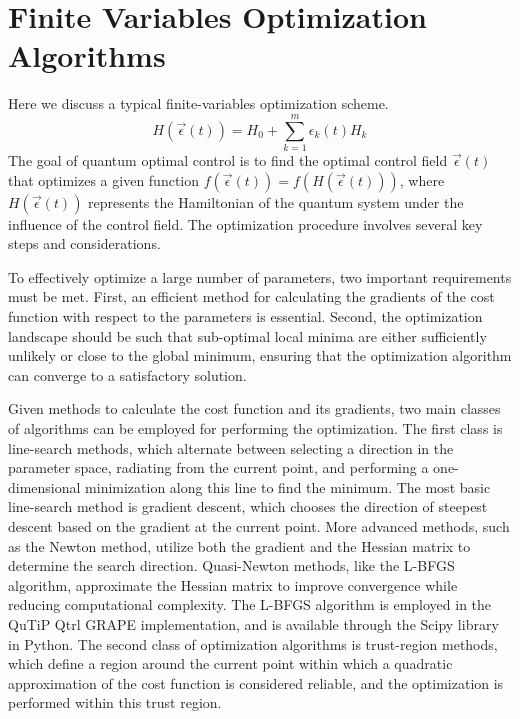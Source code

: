 \documentclass[12pt]{report}
\begin{document}
\section{Finite Variables Optimization Algorithms}\label{sec:finite_variables_optimization}
Here we discuss a typical finite-variables optimization scheme.
\begin{equation}
    H(\vec{\epsilon}(t)) = H_0 + \sum_{k=1}^m \epsilon_k(t) H_k
\end{equation}
The goal of quantum optimal control is to find the optimal control field $\vec{\epsilon}(t)$ that optimizes a given function $f(\vec{\epsilon}(t)) = f(H(\vec{\epsilon}(t)))$, where $H(\vec{\epsilon}(t))$ represents the Hamiltonian of the quantum system under the influence of the control field. 
The optimization procedure involves several key steps and considerations.
\par
To effectively optimize a large number of parameters, two important requirements must be met. 
First, an efficient method for calculating the gradients of the cost function with respect to the parameters is essential. 
Second, the optimization landscape should be such that sub-optimal local minima are either sufficiently unlikely or close to the global minimum, ensuring that the optimization algorithm can converge to a satisfactory solution.
\par
Given methods to calculate the cost function and its gradients, two main classes of algorithms can be employed for performing the optimization. 
The first class is line-search methods, which alternate between selecting a direction in the parameter space, radiating from the current point, and performing a one-dimensional minimization along this line to find the minimum. 
The most basic line-search method is gradient descent, which chooses the direction of steepest descent based on the gradient at the current point. 
More advanced methods, such as the Newton method, utilize both the gradient and the Hessian matrix to determine the search direction. 
Quasi-Newton methods, like the L-BFGS algorithm, approximate the Hessian matrix to improve convergence while reducing computational complexity. 
The L-BFGS algorithm is employed in the QuTiP Qtrl GRAPE implementation, and is available through the Scipy library in Python.
The second class of optimization algorithms is trust-region methods, which define a region around the current point within which a quadratic approximation of the cost function is considered reliable, and the optimization is performed within this trust region.
\end{document}
